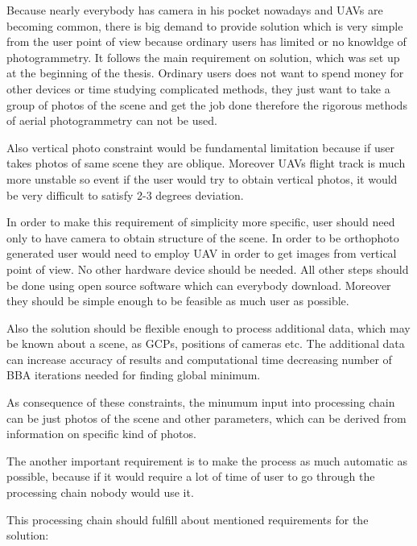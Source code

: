 \documentclass[a4paper,12pt]{report}
\begin{document}
Because nearly everybody has camera in his pocket nowadays and UAVs are becoming common, there is big demand 
to provide solution which is very simple from the user point of view because 
ordinary users has limited or no knowldge of photogrammetry. It follows the main requirement 
on solution, which was set up at the beginning of the thesis. Ordinary users does not want 
to spend money for other devices or time studying complicated methods, they just 
want to take a group of photos of the scene and get the job done therefore the rigorous 
methods of aerial photogrammetry can not be used.

Also vertical photo constraint would be fundamental limitation because if user takes 
photos of same scene they are oblique. Moreover UAVs flight track is much more unstable 
so event if the user would try to obtain vertical photos, it would be very difficult to
satisfy 2-3 degrees deviation.

In order to make this requirement of simplicity more specific, user should need only 
to have camera to obtain structure of the scene. In order to be orthophoto generated 
user would need to employ UAV in order to get images from vertical point of view.
No other hardware device should be needed. 
All other steps should be done 
using open source software which can everybody download. Moreover they should be simple enough 
to be feasible as much user as possible.

Also the solution should be flexible enough to process additional data, which may be known about a scene, 
as GCPs, positions of cameras etc. The additional data can
 increase accuracy of results and computational time  
 decreasing number of  BBA iterations needed for finding global minimum.

As consequence of these constraints, the minumum input into processing chain can be just photos
of the scene and other parameters, which can be derived from information on specific kind of photos.

The another important requirement is to make the process as much automatic as possible, because 
if it would require a lot of time of user to go through the processing chain nobody would use it.

This processing chain should fulfill about mentioned requirements for the solution:
\end{document}
